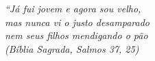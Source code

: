 \begin{epigrafe}
	\vspace*{\fill}
	\begin{flushright}

		\textit{``Já fui jovem e agora sou velho, \\
			mas nunca vi o justo desamparado \\
			nem seus filhos mendigando o pão \\
			(Bíblia Sagrada, Salmos 37, 25)}
	\end{flushright}
\end{epigrafe}
